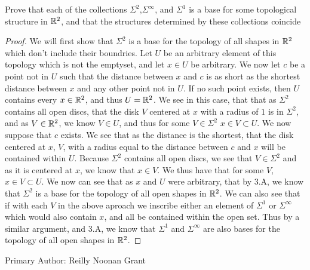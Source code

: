 \begin{minorEx}%
  Prove that each of the collections $\Sigma^2$,$\Sigma^\infty$, and
  $\Sigma^1$ is a base for some topological structure in $\mathbb{R}^2$, and
  that the structures determined by these collections coincide
\end{minorEx}
\begin{proof}
  We will first show that $\Sigma^2$ is a base for the topology of all
  shapes in $\mathbb{R}^2$ which don't include their boundries. Let $U$ be an
  arbitrary element of this topology which is not the emptyset, and
  let $x\in U$ be arbitrary. We now let $c$ be a point not in $U$ such
  that the distance between $x$ and $c$ is as short as the shortest
  distance between $x$ and any other point not in $U$. If no such
  point exists, then $U$ contains every $x\in\mathbb{R}^2$, and thus $U =
  \mathbb{R}^2$. We see in this case, that that as $\Sigma^2$ contains all open
  discs, that the disk $V$ centered at $x$ with a radius of $1$ is in
  $\Sigma^2$, and as $V\in \mathbb{R}^2$, we know $V \in U$, and thus for
  some $V\in \Sigma^2$  $x\in V \subset U$. We now suppose that $c$
  exists. We see that as the distance is the shortest, that the disk
  centered at $x$, $V$, with a radius equal to the distance between $c$ and
  $x$ will be contained within $U$. Because $\Sigma^2$ contains all open
  discs, we see that $V\in\Sigma^2$ and as it is centered at $x$, we
  know that $x \in V$. We thus have that for some $V$, $x\in V \subset
  U$. We now can see that as $x$ and $U$ were arbitrary, that by 3.A,
  we know that $\Sigma^2$ is a base for the topology of all open
  shapes in $\mathbb{R}^2$. We can also see that if with each $V$ in the
  above aproach we inscribe either an element of $\Sigma^1$ or
  $\Sigma^\infty$ which would also contain $x$, and all be contained
  within the open set. Thus by a similar argument, and 3.A, we know
  that $\Sigma^1$ and $\Sigma^\infty$ are also bases for the topology of all open
  shapes in $\mathbb{R}^2$.

\end{proof}

Primary Author: Reilly Noonan Grant
